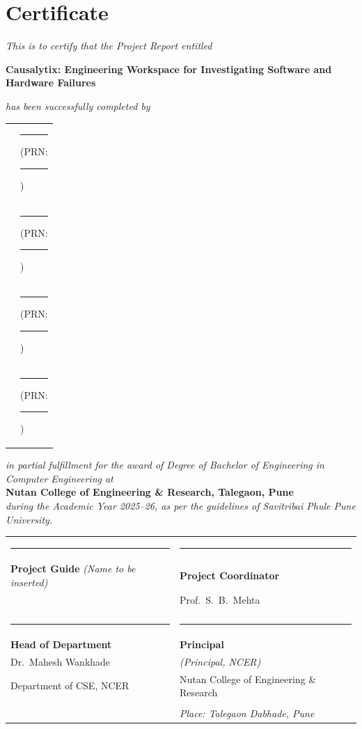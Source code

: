 \documentclass[12pt,a4paper,oneside]{report}
\newcommand{\projecttitle}{Causalytix: Engineering Workspace for Investigating Software and Hardware Failures}
\newcommand{\blankline}[1][3cm]{\rule{#1}{0.4pt}}
\begin{document}
\chapter*{Certificate}
\begin{center}
\textit{This is to certify that the Project Report entitled}
\end{center}
\begin{center}
{\large \textbf{\projecttitle}}\par
\end{center}
\begin{center}
\textit{has been successfully completed by}
\end{center}
\vspace{0.2cm}
\begin{center}
\begin{tabular}{l l}
 & \blankline[7cm] \quad (PRN: \blankline[4cm])\\
 & \blankline[7cm] \quad (PRN: \blankline[4cm])\\
 & \blankline[7cm] \quad (PRN: \blankline[4cm])\\
 & \blankline[7cm] \quad (PRN: \blankline[4cm])\\
\end{tabular}
\end{center}
\vspace{0.2cm}
\begin{center}
\textit{in partial fulfillment for the award of Degree of Bachelor of Engineering in Computer Engineering at}\\
\textbf{Nutan College of Engineering \& Research, Talegaon, Pune}\\
\textit{during the Academic Year 2025--26, as per the guidelines of Savitribai Phule Pune University.}
\end{center}
\vspace{0.8cm}
\noindent
\begin{tabular}{p{} p{}}
\blankline[5.5cm] & \blankline[5.5cm] \\
\textbf{Project Guide} \quad \textit{(Name to be inserted)} & \textbf{Project Coordinator} \\
 & Prof.\ S.\ B.\ Mehta \\
 & \\
\blankline[5.5cm] & \blankline[5.5cm] \\
\textbf{Head of Department} & \textbf{Principal} \\
Dr.\ Mahesh Wankhade & \textit{(Principal, NCER)} \\
Department of CSE, NCER & Nutan College of Engineering \& Research \\
 & \\
\textit{Date: \blankline[3cm]} & \textit{Place: Talegaon Dabhade, Pune} \\
\end{tabular}
\end{document}
